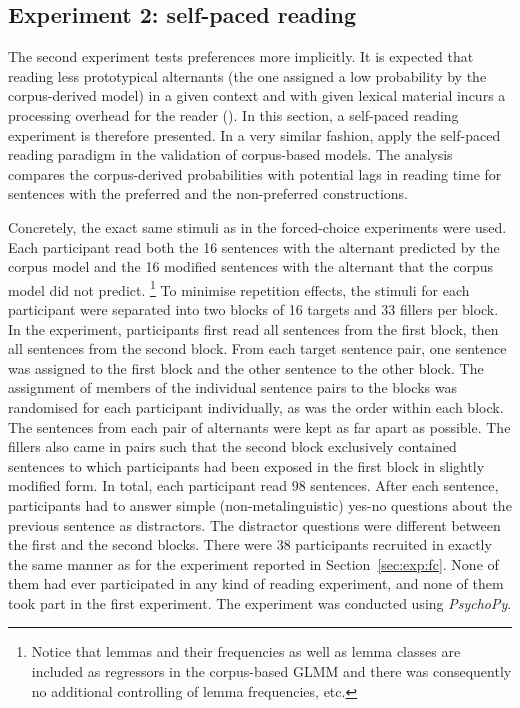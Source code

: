 \documentclass[USenglish]{article}
\begin{document}

\subsection{Experiment 2: self-paced reading}
\label{sec:exp:spr}

The second experiment tests preferences more implicitly.
It is expected that reading less prototypical alternants (the one assigned a low probability by the corpus-derived model) in a given context and with given lexical material incurs a processing overhead for the reader (\citealp{Kaiser2013}).
In this section, a self-paced reading experiment is therefore presented.
In a very similar fashion, \cite{DivjakEa2016} apply the self-paced reading paradigm in the validation of corpus-based models.
The analysis compares the corpus-derived probabilities with potential lags in reading time for sentences with the preferred and the non-preferred constructions.

Concretely, the exact same stimuli as in the forced-choice experiments were used.
Each participant read both the 16 sentences with the alternant predicted by the corpus model and the 16 modified sentences with the alternant that the corpus model did not predict.%
\footnote{Notice that lemmas and their frequencies as well as lemma classes are included as regressors in the corpus-based GLMM and there was consequently no additional controlling of lemma frequencies, etc.}
To minimise repetition effects, the stimuli for each participant were separated into two blocks of 16 targets and 33 fillers per block.
In the experiment, participants first read all sentences from the first block, then all sentences from the second block.
From each target sentence pair, one sentence was assigned to the first block and the other sentence to the other block.
The assignment of members of the individual sentence pairs to the blocks was randomised for each participant individually, as was the order within each block.
The sentences from each pair of alternants were kept as far apart as possible.
The fillers also came in pairs such that the second block exclusively contained sentences to which participants had been exposed in the first block in slightly modified form.
In total, each participant read 98 sentences.
After each sentence, participants had to answer simple (non-metalinguistic) yes-no questions about the previous sentence as distractors.
The distractor questions were different between the first and the second blocks.
There were 38 participants recruited in exactly the same manner as for the experiment reported in Section~\ref{sec:exp:fc}.
None of them had ever participated in any kind of reading experiment, and none of them took part in the first experiment.
The experiment was conducted using \textit{PsychoPy}.
\end{document}
